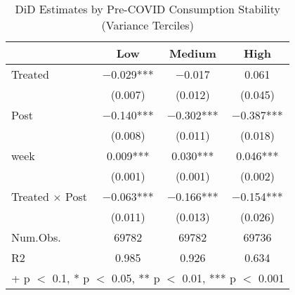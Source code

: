 \begin{table}
\centering
\caption{DiD Estimates by Pre-COVID Consumption Stability (Variance Terciles) \label{tab:did_by_variance_terciles}}
\centering
\begin{tabular*}{\textwidth}{@{\extracolsep{\fill}}lccc}
\toprule
  & Low & Medium & High\\
\midrule
Treated & \num{-0.029}*** & \num{-0.017} & \num{0.061}\\
 & (\num{0.007}) & (\num{0.012}) & (\num{0.045})\\
Post & \num{-0.140}*** & \num{-0.302}*** & \num{-0.387}***\\
 & (\num{0.008}) & (\num{0.011}) & (\num{0.018})\\
week & \num{0.009}*** & \num{0.030}*** & \num{0.046}***\\
 & (\num{0.001}) & (\num{0.001}) & (\num{0.002})\\
Treated × Post & \num{-0.063}*** & \num{-0.166}*** & \num{-0.154}***\\
 & (\num{0.011}) & (\num{0.013}) & (\num{0.026})\\
\midrule
Num.Obs. & \num{69782} & \num{69782} & \num{69736}\\
R2 & \num{0.985} & \num{0.926} & \num{0.634}\\
\bottomrule
\multicolumn{4}{l}{\rule{0pt}{1em}+ p $<$ 0.1, * p $<$ 0.05, ** p $<$ 0.01, *** p $<$ 0.001}\\
\end{tabular*}
\end{table}